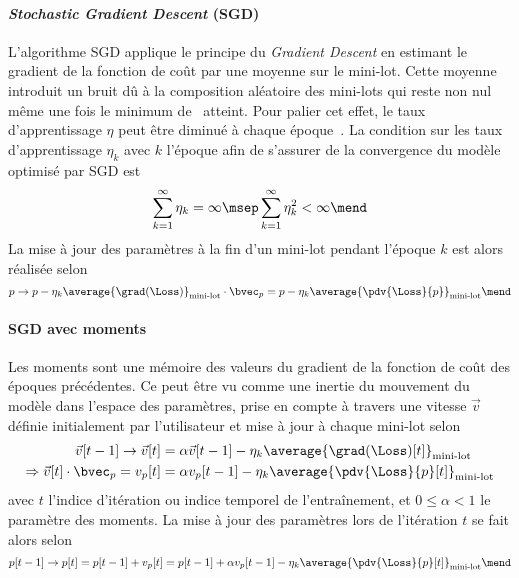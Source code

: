\paragraph{\emph{Stochastic Gradient Descent} (SGD)} \cite{SGD}
L'algorithme SGD applique le principe du \emph{Gradient Descent} en estimant le gradient de la fonction de coût par une moyenne sur le mini-lot.
Cette moyenne introduit un bruit dû à la composition aléatoire des mini-lots
qui reste non nul même une fois le minimum de \Loss\ atteint.
Pour palier cet effet, le taux d'apprentissage $\eta$ peut être diminué à chaque époque~\cite{DNN}.
La condition sur les taux d'apprentissage $\eta_k$ avec $k$ l'époque afin de s'assurer de la convergence du modèle optimisé par SGD est
\begin{equation}
\sum_{k=1}^\infty \eta_k = \infty
\msep
\sum_{k=1}^\infty \eta_k^2 < \infty
\mend
\end{equation}
La mise à jour des paramètres à la fin d'un mini-lot pendant l'époque $k$ est alors réalisée selon
\begin{equation}
p \to p - \eta_k \average{\grad(\Loss)}_\text{mini-lot} \cdot \bvec_p = p - \eta_k \average{\pdv{\Loss}{p}}_\text{mini-lot}
\mend
\end{equation}
\paragraph{SGD avec moments} \cite{DNN}
Les moments sont une \og mémoire \fg{} des valeurs du gradient de la fonction de coût des époques précédentes.
Ce peut être vu comme une inertie du mouvement du modèle dans l'espace des paramètres,
prise en compte à travers une vitesse $\vec{v}$ définie initialement par l'utilisateur et mise à jour à chaque mini-lot selon
\begin{align}
\vec{v}[t-1] \to \vec{v}[t]
&=
\alpha\vec{v}[t-1] - \eta_k \average{\grad(\Loss)[t]}_\text{mini-lot}
\\
\Rightarrow
\vec{v}[t]\cdot\bvec_p = v_p[t]
&=
\alpha v_p[t-1] - \eta_k \average{\pdv{\Loss}{p} [t]}_\text{mini-lot}
\end{align}
avec
$t$ l'indice d'itération ou indice temporel de l'entraînement,
et
$0\leq\alpha<1$ le paramètre des moments.
La mise à jour des paramètres lors de l'itération $t$ se fait alors selon
\begin{equation}
p [t-1] \to p[t]
=
p[t-1] + v_p[t]
=
p[t-1] + \alpha v_p[t-1] - \eta_k \average{\pdv{\Loss}{p} [t]}_\text{mini-lot}
\mend
\end{equation}
